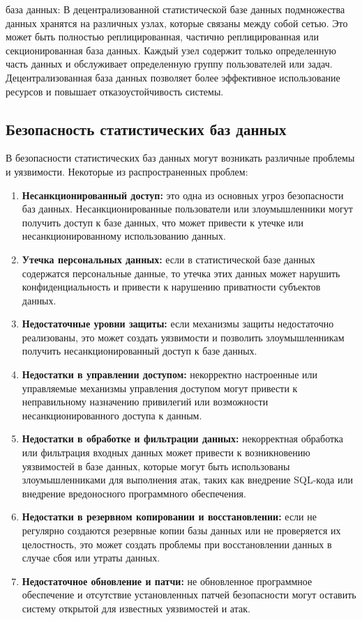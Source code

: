 \begin{enumerate}
\begin{itemize}
         база данных: В децентрализованной статистической базе данных подмножества данных хранятся на различных узлах, которые связаны между собой сетью. Это может быть полностью реплицированная, частично реплицированная или секционированная база данных. Каждый узел содержит только определенную часть данных и обслуживает определенную группу пользователей или задач. Децентрализованная база данных позволяет более эффективное использование ресурсов и повышает отказоустойчивость системы.
    \end{itemize}
\end{enumerate}

\subsection{Безопасность статистических баз данных}

В безопасности статистических баз данных могут возникать различные проблемы и уязвимости. Некоторые из распространенных проблем:
\\

\begin{enumerate}
    \item \textbf{Несанкционированный доступ: } это одна из основных угроз безопасности баз данных. Несанкционированные пользователи или злоумышленники могут получить доступ к базе данных, что может привести к утечке или несанкционированному использованию данных.
    \item \textbf{Утечка персональных данных: } если в статистической базе данных содержатся персональные данные, то утечка этих данных может нарушить конфиденциальность и привести к нарушению приватности субъектов данных.
    \item \textbf{Недостаточные уровни защиты: } если механизмы защиты недостаточно реализованы, это может создать уязвимости и позволить злоумышленникам получить несанкционированный доступ к базе данных.
    \item \textbf{Недостатки в управлении доступом: } некорректно настроенные или управляемые механизмы управления доступом могут привести к неправильному назначению привилегий или возможности несанкционированного доступа к данным.
    \item \textbf{Недостатки в обработке и фильтрации данных: } некорректная обработка или фильтрация входных данных может привести к возникновению уязвимостей в базе данных, которые могут быть использованы злоумышленниками для выполнения атак, таких как внедрение SQL-кода или внедрение вредоносного программного обеспечения.
    \item \textbf{Недостатки в резервном копировании и восстановлении: } если не регулярно создаются резервные копии базы данных или не проверяется их целостность, это может создать проблемы при восстановлении данных в случае сбоя или утраты данных.
    \item \textbf{Недостаточное обновление и патчи: } не обновленное программное обеспечение и отсутствие установленных патчей безопасности могут оставить систему открытой для известных уязвимостей и атак.
    
\end{enumerate}


